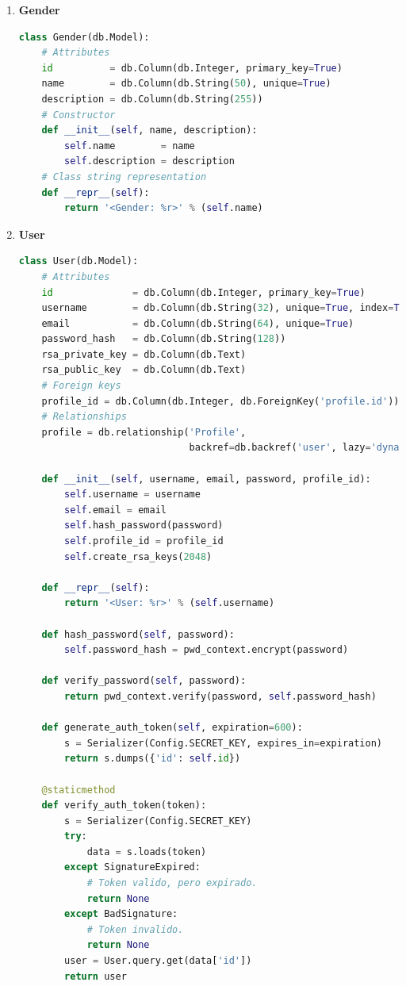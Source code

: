 \documentclass[a4paper,12pt]{article}
\begin{document}
\begin{enumerate}
\item \textbf{Gender}
	
\begin{lstlisting}[language=Python]
class Gender(db.Model):
    # Attributes
    id          = db.Column(db.Integer, primary_key=True)
    name        = db.Column(db.String(50), unique=True)
    description = db.Column(db.String(255))
	# Constructor
    def __init__(self, name, description):
        self.name        = name
        self.description = description
	# Class string representation
    def __repr__(self):
        return '<Gender: %r>' % (self.name)
\end{lstlisting}
	
\item \textbf{User}
	
\begin{lstlisting}[language=Python]
class User(db.Model):
    # Attributes
    id              = db.Column(db.Integer, primary_key=True)
    username        = db.Column(db.String(32), unique=True, index=True)
    email           = db.Column(db.String(64), unique=True)
    password_hash   = db.Column(db.String(128))
    rsa_private_key = db.Column(db.Text)
    rsa_public_key  = db.Column(db.Text)
    # Foreign keys
    profile_id = db.Column(db.Integer, db.ForeignKey('profile.id'))
    # Relationships
    profile = db.relationship('Profile',
                              backref=db.backref('user', lazy='dynamic'))

    def __init__(self, username, email, password, profile_id):
        self.username = username
        self.email = email
        self.hash_password(password)
        self.profile_id = profile_id
        self.create_rsa_keys(2048)

    def __repr__(self):
        return '<User: %r>' % (self.username)

    def hash_password(self, password):
        self.password_hash = pwd_context.encrypt(password)

    def verify_password(self, password):
        return pwd_context.verify(password, self.password_hash)

    def generate_auth_token(self, expiration=600):
        s = Serializer(Config.SECRET_KEY, expires_in=expiration)
        return s.dumps({'id': self.id})

    @staticmethod
    def verify_auth_token(token):
        s = Serializer(Config.SECRET_KEY)
        try:
            data = s.loads(token)
        except SignatureExpired:
            # Token valido, pero expirado.
            return None
        except BadSignature:
            # Token invalido.
            return None
        user = User.query.get(data['id'])
        return user


\end{lstlisting}
\end{enumerate}
\end{document}
